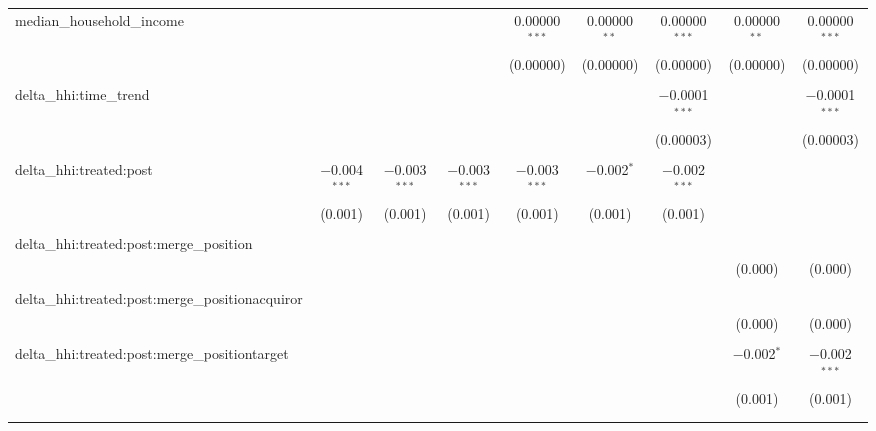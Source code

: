 \begin{table}[H]
{\begin{tabular}{@{\extracolsep{5pt}}lcccccccc}
  median\_household\_income &  &  &  & 0.00000$^{***}$ & 0.00000$^{**}$ & 0.00000$^{***}$ & 0.00000$^{**}$ & 0.00000$^{***}$ \\  

   &  &  &  & (0.00000) & (0.00000) & (0.00000) & (0.00000) & (0.00000) \\  

   & & & & & & & & \\  

  delta\_hhi:time\_trend &  &  &  &  &  & $-$0.0001$^{***}$ &  & $-$0.0001$^{***}$ \\  

   &  &  &  &  &  & (0.00003) &  & (0.00003) \\  

   & & & & & & & & \\  

  delta\_hhi:treated:post & $-$0.004$^{***}$ & $-$0.003$^{***}$ & $-$0.003$^{***}$ & $-$0.003$^{***}$ & $-$0.002$^{*}$ & $-$0.002$^{***}$ &  &  \\  

   & (0.001) & (0.001) & (0.001) & (0.001) & (0.001) & (0.001) &  &  \\  

   & & & & & & & & \\  

  delta\_hhi:treated:post:merge\_position &  &  &  &  &  &  &  &  \\  

   &  &  &  &  &  &  & (0.000) & (0.000) \\  

   & & & & & & & & \\  

  delta\_hhi:treated:post:merge\_positionacquiror &  &  &  &  &  &  &  &  \\  

   &  &  &  &  &  &  & (0.000) & (0.000) \\  

   & & & & & & & & \\  

  delta\_hhi:treated:post:merge\_positiontarget &  &  &  &  &  &  & $-$0.002$^{*}$ & $-$0.002$^{***}$ \\  

   &  &  &  &  &  &  & (0.001) & (0.001) \\  

   & & & & & & & & \\  

 \hline \\[-1.8ex]  


\end{tabular}}
\end{table}
